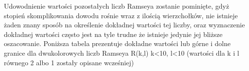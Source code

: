 \documentclass[11pt]{article}
\begin{document}
\begin{enumerate}
 Udowodnienie wartości pozostałych liczb Ramseya zostanie pominięte, gdyż stopień skomplikowania dowodu rośnie wraz z ilością wierzchołków, nie istnieje żaden znany sposób na określenie dokładnej wartości tej liczby, oraz wyznaczenie dokładnej wartości często jest na tyle trudne że istnieje jedynie jej bliższe oszacowanie. Poniższa tabela prezentuje dokładne wartości lub górne i dolne granice dla dwukolorowych liczb Ramseya R(k,l) k<10, l<10 (wartości dla k i l równego 2 albo 1 zostały opisane wcześniej)
 
\hfill 
\begin{figure}[h]
  \centering
{}
\end{figure}
\end{enumerate}
\end{document}
